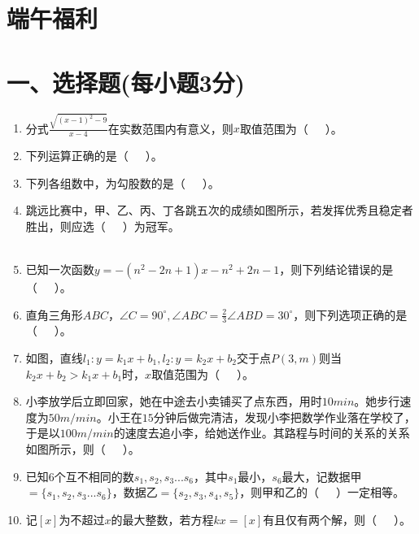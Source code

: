 \documentclass[10pt]{article}
\begin{document}
\section*{\centering 端午福利}
\section*{\normalsize 一、选择题(每小题3分)}
\begin{enumerate}\setcounter{enumi}{0}
    \item 分式$\frac{\sqrt{(x-1)^2-9}}{x-4}$在实数范围内有意义，则$x$取值范围为（~~~）。
    \item 下列运算正确的是（~~~）。
    \item 下列各组数中，为勾股数的是（~~~）。
    \item 跳远比赛中，甲、乙、丙、丁各跳五次的成绩如图所示，若发挥优秀且稳定者胜出，则应选（~~~）为冠军。\\
    \\
    \item 已知一次函数$y=-(n^2-2n+1)x-n^2+2n-1$，则下列结论错误的是（~~~）。
    \item 直角三角形$ABC$，$\angle C=90^\circ,\angle ABC=\frac{2}{3}\angle ABD=30^\circ$，则下列选项正确的是（~~~）。
    \\
    \item 如图，直线$l_1:y=k_1x+b_1,l_2:y=k_2x+b_2$交于点$P(3,m)$则当$k_2x+b_2>k_1x+b_1$时，$x$取值范围为（~~~）。
    \\
    \item 小李放学后立即回家，她在中途去小卖铺买了点东西，用时$10min$。她步行速度为$50m/min$。小王在$15$分钟后做完清洁，发现小李把数学作业落在学校了，于是以$100m/min$的速度去追小李，给她送作业。其路程与时间的关系的关系如图所示，则（~~~）。
    \item 已知$6$个互不相同的数$s_1,s_2,s_3...s_6$，其中$s_1$最小，$s_6$最大，记数据甲$=\{s_1,s_2,s_3...s_6\}$，数据乙$=\{s_2,s_3,s_4,s_5\}$，则甲和乙的（~~~）一定相等。
    \item 记$[x]$为不超过$x$的最大整数，若方程$kx=[x]$有且仅有两个解，则（~~~）。
\end{enumerate}
\end{document}
